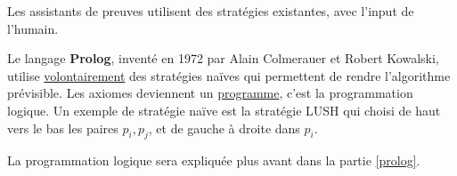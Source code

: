 Les assistants de preuves utilisent des stratégies existantes, avec l'input de l'humain.

Le langage \textbf{Prolog}, inventé en 1972 par Alain Colmerauer et Robert Kowalski, utilise \underline{volontairement} des stratégies naïves qui permettent de rendre l'algorithme prévisible. Les axiomes deviennent un \underline{programme}, c'est la programmation logique. Un exemple de stratégie naïve est la stratégie LUSH qui choisi de haut vers le bas les paires $p_i, p_j$, et de gauche à droite dans $p_i$.

La programmation logique sera expliquée plus avant dans la partie \ref{prolog}.
